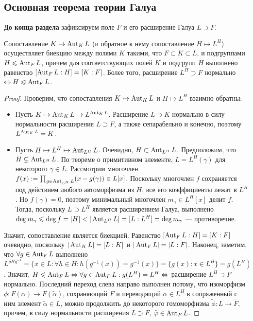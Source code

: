 \subsection{Основная теорема теории Галуа}

\textbf{До конца раздела} зафиксируем поле $F$ и его расширение Галуа $L \supset F$.

\begin{theorem}
	Сопоставление $K \mapsto \operatorname{Aut}_{K}L$ (и обратное к нему сопоставление $H \mapsto L^H$) осуществляет биекцию между полями $K$ такими, что $F \subset K \subset L$, и подгруппами $H \leqslant \operatorname{Aut}_F{L}$, причем для соответствующих полей $K$ и подгрупп $H$ выполнено равенство $[\operatorname{Aut}_FL : H] = [K : F]$. Более того, расширение $L^H \supset F$ нормально $\Leftrightarrow H \trianglelefteqslant \operatorname{Aut}_F{L}$.
\end{theorem}

\begin{proof}
	Проверим, что сопоставления $K \mapsto \operatorname{Aut}_{K}L$ и $H \mapsto L^H$ взаимно обратны:
	\begin{itemize}
		\item Пусть $K \mapsto \operatorname{Aut}_{K}L \mapsto L^{\operatorname{Aut}_{K}L}$. Расширение $L \supset K$ нормально в силу нормальности расширения $L \supset F$, а также сепарабельно и конечно, поэтому $L^{\operatorname{Aut}_K{L}} = K$.
		\item Пусть $H \mapsto L^H \mapsto \operatorname{Aut}_{L^H}L$. Очевидно, $H \subset \operatorname{Aut}_{L^H}L$. Предположим, что $H \subsetneq \operatorname{Aut}_{L^H}L$. По теореме о примитивном элементе, $L = L^H(\gamma)$ для некоторого $\gamma \in L$. Рассмотрим многочлен $f(x) := \prod_{g \in \operatorname{Aut}_{L^H}L}(x - g(\gamma)) \in L[x]$. Поскольку многочлен $f$ сохраняется под действием любого автоморфизма из $H$, все его коэффициенты лежат в $L^H$. Но $f(\gamma) = 0$, поэтому минимальный многочлен $m_\gamma \in L^H[x]$ делит $f$. Тогда, поскольку $L \supset L^H$ является расширением Галуа, выполнено $\deg{m_\gamma} \le \deg{f} = |H| < |\Aut_{L^H}L| \hm= [L : L^H] = \deg{m_\gamma}$ --- противоречие.
	\end{itemize}
	
	Значит, сопоставление является биекцией. Равенство $[\operatorname{Aut}_FL : H] = [K : F]$ очевидно, поскольку $|\operatorname{Aut}_KL| = [L : K]$ и $|\operatorname{Aut}_FL| = |L : F|$. Наконец, заметим, что $\forall g \in \operatorname{Aut}_FL$ выполнено $L^{gHg^{-1}} = \{x \in L: \forall h \in H: h(g^{-1}(x)) = g^{-1}(x)\}= \{g(x) : x \in L^H\} = g(L^H)$. Значит, $H \trianglelefteqslant \operatorname{Aut}_FL \Leftrightarrow \forall g \in \operatorname{Aut}_FL: g(L^H) = L^H \Leftrightarrow$ расширение $L^H \supset F$ нормально. Последний переход слева направо выполнен потому, что изоморфизм $\phi: F(\alpha) \to F(\widetilde\alpha)$, сохраняющий $F$ и переводящий $\alpha \in L^H$ в сопряженный с ним элемент $\widetilde\alpha \in L$, можно продолжить до некоторого гомоморфизма $\widetilde\phi: L \to \overline{F}$, причем, в силу нормальности расширения $L \supset F$, $\widetilde{\varphi} \in \operatorname{Aut}_FL$.
\end{proof}